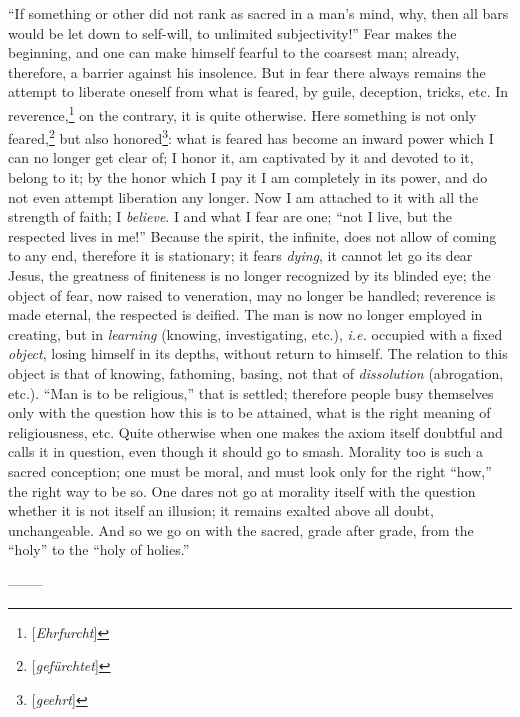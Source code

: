 ``If something or other did not rank as sacred in a man's mind, why, then 
all bars would be let down to self-will, to unlimited subjectivity!'' Fear 
makes the beginning, and one can make himself fearful to the coarsest man; 
already, therefore, a barrier against his insolence. But in fear there always 
remains the attempt to liberate oneself from what is feared, by guile, 
deception, tricks, etc. In reverence,\footnote{[\textit{Ehrfurcht}]} on the 
contrary, it is quite otherwise. Here something is not only 
feared,\footnote{[\textit{gef\"urchtet}]} but also 
honored\footnote{[\textit{geehrt}]}: what is feared has become an inward power 
which I can no longer get clear of; I honor it, am captivated by it and 
devoted to it, belong to it; by the honor which I pay it I am completely in 
its power, and do not even attempt liberation any longer. Now I am attached to 
it with all the strength of faith; I \textit{believe}. I and what I fear are 
one; ``not I live, but the respected lives in me!'' Because the spirit, the 
infinite, does not allow of coming to any end, therefore it is stationary; it 
fears \textit{dying}, it cannot let go its dear Jesus, the greatness of 
finiteness is no longer recognized by its blinded eye; the object of fear, now 
raised to veneration, may no longer be handled; reverence is made eternal, the 
respected is deified. The man is now no longer employed in creating, but in 
\textit{learning} (knowing, investigating, etc.), \textit{i.e.} occupied with 
a fixed \textit{object}, losing himself in its depths, without return to 
himself. The relation to this object is that of knowing, fathoming, basing, 
not that of \textit{dissolution} (abrogation, etc.). ``Man is to be 
religious,'' that is settled; therefore people busy themselves only with the 
question how this is to be attained, what is the right meaning of 
religiousness, etc. Quite otherwise when one makes the axiom itself doubtful 
and calls it in question, even though it should go to smash. Morality too is 
such a sacred conception; one must be moral, and must look only for the right 
``how,'' the right way to be so. One dares not go at morality itself with 
the question whether it is not itself an illusion; it remains exalted above 
all doubt, unchangeable. And so we go on with the sacred, grade after grade, 
from the ``holy'' to the ``holy of holies.''

\begin{center}
--------\end{center}


